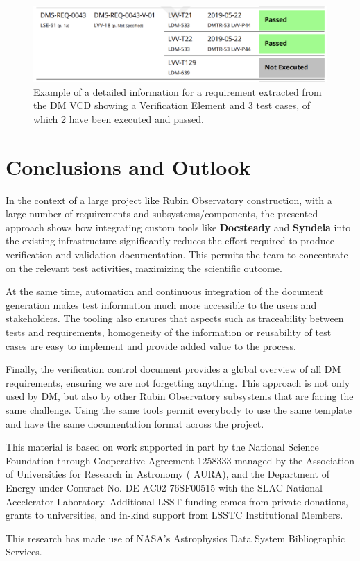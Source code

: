 \begin{figure}
\begin{center}
\includegraphics[width=\textwidth]{imgs/VCDdetail.png}
 \caption{Example of a detailed information for a requirement extracted from the DM VCD 
 showing a Verification Element and 3 test cases, of which 2 have been executed and passed.}
 \label{fig:vcddetail}
\end{center}
\end{figure}


\section{Conclusions and Outlook}

In the context of a large project like Rubin Observatory construction, with a large number of requirements
and subsystems/components, the presented approach shows how integrating custom tools like \textbf{Docsteady}
and \textbf{Syndeia} into the existing infrastructure significantly reduces the effort
required to produce verification and validation documentation.
This permits the team to concentrate on the relevant test activities, maximizing the scientific outcome.

At the same time, automation and continuous integration of the document generation makes test information
much more accessible to the users and stakeholders.
The tooling also ensures that aspects such as traceability between tests and requirements, homogeneity of the information
or reusability of test cases are easy to implement and provide added value to the process.

Finally, the verification control document provides a global overview of all DM requirements, ensuring we are not forgetting anything.
This approach is not only used by DM, but also by other Rubin Observatory subsystems that are facing the same challenge.
Using the same tools permit everybody to use the same template and have the same documentation format across the project.

\acknowledgments
This material is based on work supported in part by the  {National Science Foundation} through Cooperative Agreement 1258333 managed by the  {Association of Universities for Research in Astronomy} ( {AURA}), and the  {Department of Energy} under  {Contract} No.  {DE}-AC02-76SF00515 with the  {SLAC} National Accelerator Laboratory. Additional LSST funding comes from private donations, grants to universities, and in-kind support from LSSTC Institutional Members.

This research has made use of  NASA's Astrophysics Data System Bibliographic Services.
